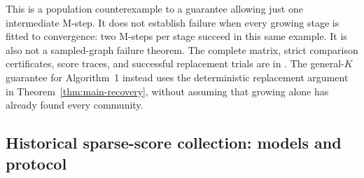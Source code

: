 This is a population counterexample to a guarantee allowing just one
intermediate M-step. It does not establish failure when every growing stage
is fitted to convergence: two M-steps per stage succeed in this same example.
It is also not a sampled-graph failure theorem. The complete matrix, strict
comparison certificates, score traces, and successful replacement trials are
in .
The general-$K$ guarantee for Algorithm~1 instead uses the deterministic
replacement argument in Theorem~\ref{thm:main-recovery}, without assuming
that growing alone has already found every community.

\subsection{Historical sparse-score collection: models and protocol}

